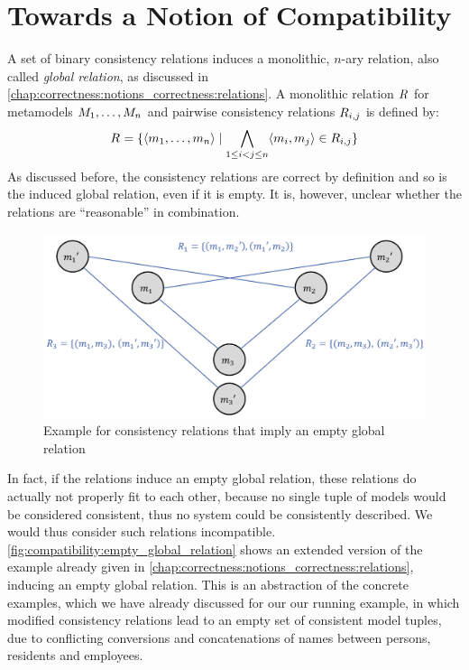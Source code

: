 \section{Towards a Notion of Compatibility}

A set of binary consistency relations induces a monolithic, $n$-ary relation, also called \emph{global relation}, as discussed in \autoref{chap:correctness:notions_correctness:relations}.
A monolithic relation $R_{}$ for metamodels $M_{1}, \dots, M_{n}$ and pairwise consistency relations $R_{i,j}$ is defined by:
\begin{align*}
    R_{} = \{ \langle m_{1}, \dots, m_{n} \rangle \mid \bigwedge\limits_{1 \le i < j \le n} \langle m_{i}, m_{j} \rangle \in R_{i,j} \}
\end{align*}
As discussed before, the consistency relations are correct by definition and so is the induced global relation, even if it is empty.
It is, however, unclear whether the relations are \enquote{reasonable} in combination.

\begin{figure}
    \centering
    \includegraphics[width=\textwidth]{figures/correctness/compatibility/empty_global_relation.png}
    \caption[Consistency relations that imply an empty global relation]{Example for consistency relations that imply an empty global relation}
    \label{fig:compatibility:empty_global_relation}
\end{figure}

In fact, if the relations induce an empty global relation, these relations do actually not properly fit to each other, because no single tuple of models would be considered consistent, thus no system could be consistently described.
We would thus consider such relations incompatible.
\autoref{fig:compatibility:empty_global_relation} shows an extended version of the example already given in \autoref{chap:correctness:notions_correctness:relations}, inducing an empty global relation.
This is an abstraction of the concrete examples, which we have already discussed for our our running example, in which modified consistency relations lead to an empty set of consistent model tuples, due to conflicting conversions and concatenations of names between persons, residents and employees.

